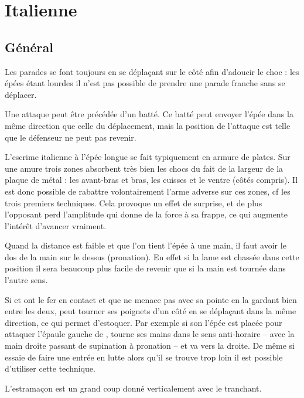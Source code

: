 \section{Italienne}


\subsection{Général}



Les parades se font toujours en se déplaçant sur le côté afin d'adoucir le choc : les épées étant lourdes il n'est pas possible de prendre une parade franche sans se déplacer.

Une attaque peut être précédée d'un batté.
Ce batté peut envoyer l'épée dans la même direction que celle du déplacement, mais la position de l'attaque est telle que le défenseur ne peut pas revenir.

L'escrime italienne à l'épée longue se fait typiquement en armure de plates.
Sur une amure trois zones absorbent très bien les chocs du fait de la largeur de la plaque de métal : les avant-bras et bras, les cuisses et le ventre (côtés compris).
Il est donc possible de rabattre volontairement l'arme adverse sur ces zones, cf les trois premiers techniques.
Cela provoque un effet de surprise, et de plus l'opposant perd l'amplitude qui donne de la force à sa frappe, ce qui augmente l'intérêt d'avancer vraiment.

Quand la distance est faible et que l'on tient l'épée à une main, il faut avoir le dos de la main sur le dessus (pronation).
En effet si la lame est chassée dans cette position il sera beaucoup plus facile de revenir que si la main est tournée dans l'autre sens.

Si \A et \D ont le fer en contact et que \A ne menace pas \D avec sa pointe en la gardant bien entre les deux, \D peut tourner ses poignets d'un côté en se déplaçant dans la même direction, ce qui permet d'estoquer.
Par exemple si son l'épée est placée pour attaquer l'épaule gauche de \A, \D tourne ses mains dans le sens anti-horaire – avec la main droite passant de supination à pronation – et va vers la droite.
De même si \A essaie de faire une entrée en lutte alors qu'il se trouve trop loin il est possible d'utiliser cette technique.


\begin{coup}[Estramaçon]

L'estramaçon est un grand coup donné verticalement avec le tranchant.
\end{coup}


